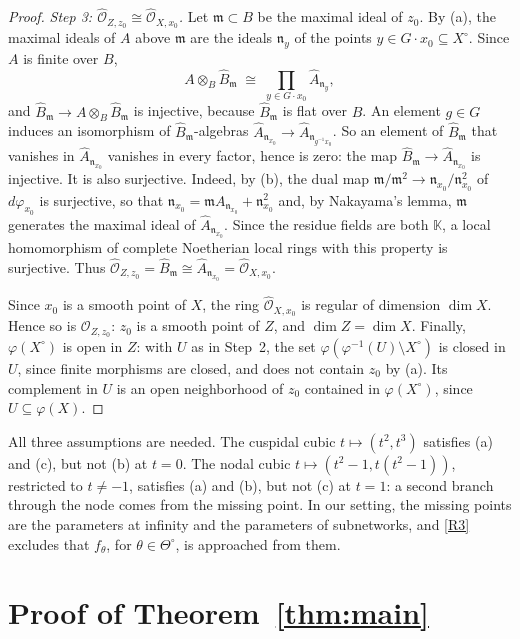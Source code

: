 \documentclass[11pt]{article}
\theoremstyle{definition}
\theoremstyle{remark}
\newcommand{\K}{\mathbb{K}}
\newcommand{\cO}{\mathcal{O}}
\newcommand{\fm}{\mathfrak{m}}
\newcommand{\fn}{\mathfrak{n}}
\newcommand{\sm}{\setminus}
\newcommand{\To}{\Theta^{\circ}}
\begin{document}
\begin{proof}
\emph{Step 3: $\widehat{\cO}_{Z,z_0}\cong\widehat{\cO}_{X,x_0}$.} Let $\fm\subset B$ be the maximal ideal of $z_0$. By (a), the maximal ideals of $A$ above $\fm$ are the ideals $\fn_y$ of the points $y\in G\cdot x_0\subseteq X^\circ$. Since $A$ is finite over $B$,
\[
A\otimes_B\widehat B_\fm\;\cong\;\prod_{y\in G\cdot x_0}\widehat A_{\fn_y},
\]
and $\widehat B_\fm\to A\otimes_B\widehat B_\fm$ is injective, because $\widehat B_\fm$ is flat over $B$. An element $g\in G$ induces an isomorphism of $\widehat B_\fm$-algebras $\widehat A_{\fn_{x_0}}\to\widehat A_{\fn_{g^{-1}x_0}}$. So an element of $\widehat B_\fm$ that vanishes in $\widehat A_{\fn_{x_0}}$ vanishes in every factor, hence is zero: the map $\widehat B_\fm\to\widehat A_{\fn_{x_0}}$ is injective. It is also surjective. Indeed, by (b), the dual map $\fm/\fm^2\to\fn_{x_0}/\fn_{x_0}^2$ of $d\varphi_{x_0}$ is surjective, so that $\fn_{x_0}=\fm A_{\fn_{x_0}}+\fn_{x_0}^2$ and, by Nakayama's lemma, $\fm$ generates the maximal ideal of $\widehat A_{\fn_{x_0}}$. Since the residue fields are both $\K$, a local homomorphism of complete Noetherian local rings with this property is surjective. Thus $\widehat{\cO}_{Z,z_0}=\widehat B_\fm\cong\widehat A_{\fn_{x_0}}=\widehat{\cO}_{X,x_0}$.

Since $x_0$ is a smooth point of $X$, the ring $\widehat{\cO}_{X,x_0}$ is regular of dimension $\dim X$. Hence so is $\cO_{Z,z_0}$: $z_0$ is a smooth point of $Z$, and $\dim Z=\dim X$. Finally, $\varphi(X^\circ)$ is open in $Z$: with $U$ as in Step~2, the set $\varphi(\varphi^{-1}(U)\sm X^\circ)$ is closed in $U$, since finite morphisms are closed, and does not contain $z_0$ by (a). Its complement in $U$ is an open neighborhood of $z_0$ contained in $\varphi(X^\circ)$, since $U\subseteq\varphi(X)$.
\end{proof}

All three assumptions are needed. The cuspidal cubic $t\mapsto(t^2,t^3)$ satisfies (a) and (c), but not (b) at $t=0$. The nodal cubic $t\mapsto(t^2-1,t(t^2-1))$, restricted to $t\ne-1$, satisfies (a) and (b), but not (c) at $t=1$: a second branch through the node comes from the missing point. In our setting, the missing points are the parameters at infinity and the parameters of subnetworks, and \ref{R3} excludes that $f_\theta$, for $\theta\in\To$, is approached from them.

\section{Proof of Theorem~\ref{thm:main}}
\end{document}

